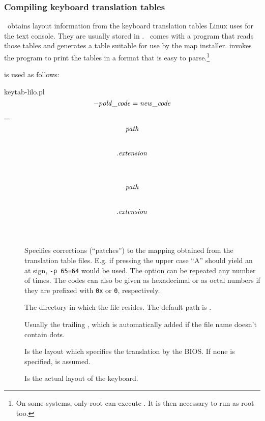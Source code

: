 \subsubsection{Compiling keyboard translation tables}

\LILO\ obtains layout information from the keyboard translation tables
Linux uses for the text console. They are usually stored in
. \LILO\ comes with a program
 that reads those tables and generates a table
suitable for use by the map installer.  invokes
the program  to print the tables in a format that is
easy to parse.\footnote{On some systems, only root can execute
. It is then necessary to run  as
root too.}

 is used as follows:

\begin{command}
  keytab-lilo.pl
    \unit{\[ -p {\it old\_code\/}={\it new\_code\/} \] $\ldots$}
    \unit{\[{\it path\/}\]\[.{\it extension\/}\] \]} \\
    \unit{\[{\it path\/}\]\[.{\it extension\/}\] \]}
\end{command}

\begin{description}
  \item[]~\\
    Specifies corrections (``patches'') to the mapping obtained from the
    translation table files. E.g. if pressing the upper case ``A'' should
    yield an at sign, \verb"-p 65=64" would be used. The  option can
    be repeated any number of times. The codes can also be given as
    hexadecimal or as octal numbers if they are prefixed with \verb"0x" or
    \verb"0", respectively.
  \item[] The directory in which the file resides. The default
    path is .
  \item[] Usually the trailing , which is
    automatically added if the file name doesn't contain dots.
  \item[] Is the layout which specifies the
    translation by the BIOS. If none is specified,  is assumed.
  \item[] Is the actual layout of the keyboard.
\end{description}

